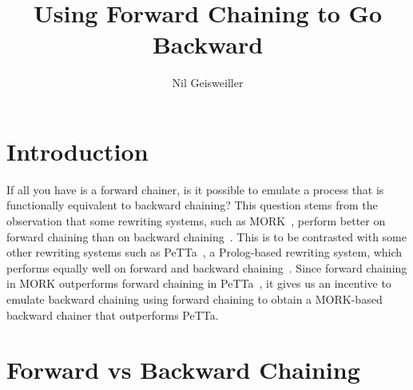 \documentclass{easychair}
\title{Using Forward Chaining to Go Backward}
\author{Nil Geisweiller}
\institute{
  SingularityNET Foundation,\\
  Zug, Switzerland\\
  \email{nil@singularitynet.io}
}
\begin{document}
\maketitle


\section{Introduction}

If all you have is a forward chainer, is it possible to emulate a
process that is functionally equivalent to backward chaining?
This question stems from the observation that some rewriting systems,
such as MORK~\cite{MORKRepo}, perform better on forward chaining than
on backward chaining~\cite{Geisweiller2026MetamathBenchmark}.  This is
to be contrasted with some other rewriting systems such as
PeTTa~\cite{PeTTaRepo}, a Prolog-based rewriting system, which
performs equally well on forward and backward
chaining~\cite{Geisweiller2026MetamathBenchmark}.  Since forward
chaining in MORK outperforms forward chaining in
PeTTa~\cite{Geisweiller2026MetamathBenchmark}, it gives us an
incentive to emulate backward chaining using forward chaining to
obtain a MORK-based backward chainer that outperforms PeTTa.

\section{Forward vs Backward Chaining}
\end{document}
